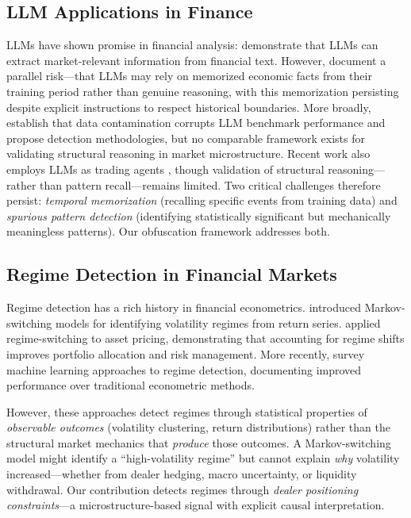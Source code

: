 \subsection{LLM Applications in Finance}

LLMs have shown promise in financial analysis: \citet{lopez2023can} demonstrate that LLMs can extract market-relevant information from financial text. However, \citet{lopezlira2025memorization} document a parallel risk---that LLMs may rely on memorized economic facts from their training period rather than genuine reasoning, with this memorization persisting despite explicit instructions to respect historical boundaries. More broadly, \citet{dong2024generalization} establish that data contamination corrupts LLM benchmark performance and propose detection methodologies, but no comparable framework exists for validating structural reasoning in market microstructure. Recent work also employs LLMs as trading agents \citep{yang2024tradingagents}, though validation of structural reasoning---rather than pattern recall---remains limited. Two critical challenges therefore persist: \textit{temporal memorization} (recalling specific events from training data) and \textit{spurious pattern detection} (identifying statistically significant but mechanically meaningless patterns). Our obfuscation framework addresses both.

\subsection{Regime Detection in Financial Markets}

Regime detection has a rich history in financial econometrics. \citet{hamilton1989new} introduced Markov-switching models for identifying volatility regimes from return series. \citet{ang2002regime} applied regime-switching to asset pricing, demonstrating that accounting for regime shifts improves portfolio allocation and risk management. More recently, \citet{nystrup2020regime} survey machine learning approaches to regime detection, documenting improved performance over traditional econometric methods.

However, these approaches detect regimes through statistical properties of \textit{observable outcomes} (volatility clustering, return distributions) rather than the structural market mechanics that \textit{produce} those outcomes. A Markov-switching model might identify a ``high-volatility regime'' but cannot explain \textit{why} volatility increased---whether from dealer hedging, macro uncertainty, or liquidity withdrawal. Our contribution detects regimes through \textit{dealer positioning constraints}---a microstructure-based signal with explicit causal interpretation.


